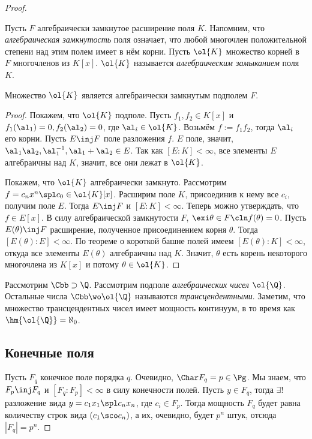 \documentclass[a4paper]{article}
\begin{document}
\begin{proof}
\begin{df}
Пусть $F$ алгебраически замкнутое расширение поля $K$. Напомним, что  \emph{алгебраическая замкнутость}
поля означает, что любой многочлен положительной степени над этим полем имеет в нём корни. Пусть $\ol{K}$
множество корней в $F$ многочленов из $K[x]$. $\ol{K}$ называется \emph{алгебраическим замыканием} поля $K$.
\end{df}

\begin{theorem}
Множество $\ol{K}$ является алгебраически замкнутым подполем $F$.
\end{theorem}
\begin{proof}
Покажем, что $\ol{K}$ подполе. Пусть $f_1, f_2\in K[x]$ и  $f_1(\al_1)=0, f_2(\al_2)=0$, где $\al_i \in
\ol{K}$. Возьмём $f:=f_1f_2$, тогда $\al_i$ его корни. Пусть $E \inj F$ поле разложения $f$. $E$ поле,
значит, $\al_1\al_2, \al_1^{-1}, \al_1 + \al_2 \in E$. Так как $[E:K]<\infty$, все элементы $E$ алгебраичны
над $K$, значит, все они лежат в $\ol{K}$.

Покажем, что $\ol{K}$ алгебраически замкнуто. Рассмотрим  $f = c_nx^n \spl c_0 \in \ol{K}[x]$.  Расширим поле
$K$, присоединив к нему все $c_i$, получим поле $E$. Тогда $E \inj F$ и $[E:K] < \infty$. Теперь можно
утверждать, что $f \in E[x]$. В силу алгебраической замкнутости $F$, $\exi \theta \in F\cln f(\theta)=0$. Пусть
$E(\theta) \inj F$ расширение, полученное присоединением корня $\theta$. Тогда $[E(\theta):E]< \infty$. По
теореме о короткой башне полей имеем $[E(\theta):K]< \infty$, откуда все элементы $E(\theta)$ алгебраичны над
$K$. Значит, $\theta$ есть корень некоторого многочлена из $K[x]$ и потому $\theta \in \ol{K}$.
\end{proof}

\begin{ex}
Рассмотрим $\Cbb \supset \Q$. Рассмотрим подполе \emph{алгебраических чисел}  $\ol{\Q}$. Остальные числа
$\Cbb \wo \ol{\Q}$ называются \emph{трансцендентными}. Заметим, что множество трансцендентных чисел имеет
мощность континуум, в то время как $\hm{\ol{\Q}}=\aleph_0$.
\end{ex}

\subsection{Конечные поля}

Пусть $F_q$ конечное поле порядка $q$. Очевидно,  $\Char F_q = p \in \Pg$. Мы знаем, что $F_p \inj F_q$ и
$[F_q:F_p] < \infty$ в силу конечности полей. Пусть $y \in F_q$, тогда $\exi!$ разложение вида $y=c_1x_1 \spl
c_nx_n$, где $c_i \in F_p$. Тогда мощность $F_q$ будет равна количеству строк вида $(c_1\sco c_n)$, а их,
очевидно, будет $p^n$ штук, отсюда $|F_q|=p^n$.


\end{proof}
\end{document}
